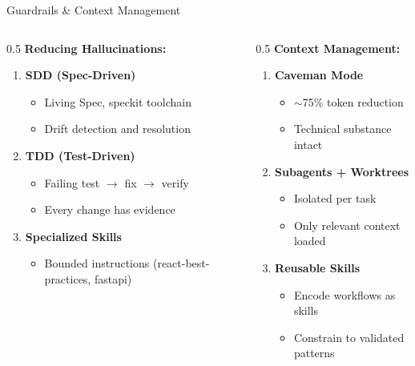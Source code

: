 \documentclass[aspectratio=169]{beamer}
\begin{document}
\begin{frame}{Guardrails \& Context Management}
  \begin{columns}[T]
    \begin{column}{0.5\textwidth}
      \textbf{Reducing Hallucinations:}
      \begin{enumerate}
        \item \textbf{SDD (Spec-Driven)}
        \begin{itemize}
          \item Living Spec, speckit toolchain
          \item Drift detection and resolution
        \end{itemize}
        \vspace{0.3em}
        \item \textbf{TDD (Test-Driven)}
        \begin{itemize}
          \item Failing test $\rightarrow$ fix $\rightarrow$ verify
          \item Every change has evidence
        \end{itemize}
        \vspace{0.3em}
        \item \textbf{Specialized Skills}
        \begin{itemize}
          \item Bounded instructions (react-best-practices, fastapi)
        \end{itemize}
      \end{enumerate}
    \end{column}
    \begin{column}{0.5\textwidth}
      \textbf{Context Management:}
      \begin{enumerate}
        \item \textbf{Caveman Mode}
        \begin{itemize}
          \item $\sim$75\% token reduction
          \item Technical substance intact
        \end{itemize}
        \vspace{0.3em}
        \item \textbf{Subagents + Worktrees}
        \begin{itemize}
          \item Isolated per task
          \item Only relevant context loaded
        \end{itemize}
        \vspace{0.3em}
        \item \textbf{Reusable Skills}
        \begin{itemize}
          \item Encode workflows as skills
          \item Constrain to validated patterns
        \end{itemize}
      \end{enumerate}
    \end{column}
  \end{columns}
\end{frame}
\end{document}
